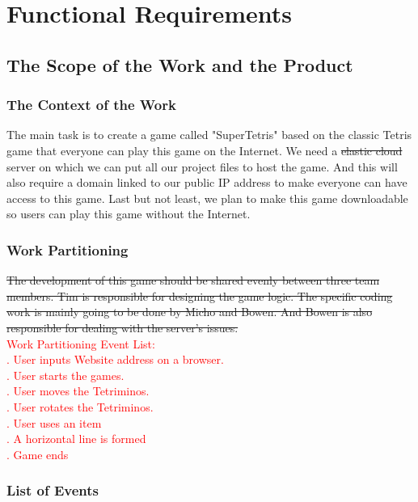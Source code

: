 \documentclass[12pt, titlepage]{article}
\begin{document}
\section{Functional Requirements}

\subsection{The Scope of the Work and the Product}

\subsubsection{The Context of the Work}
\tab The main task is to create a game called "SuperTetris" based on the classic Tetris game that everyone can play this game on the Internet. We need a \st{elastic cloud} server on which we can put all our project files to host the game. And this will also require a domain linked to our public IP address to make everyone can have access to this game. Last but not least, we plan to make this game downloadable so users can play this game without the Internet.
\subsubsection{Work Partitioning}
\tab \st{The development of this game should be shared evenly between three team members. Tim is responsible for designing the game logic. The specific coding work is mainly going to be done by Micho and Bowen. And Bowen is also responsible for dealing with the server's issues.}\\
\textcolor{red} {Work Partitioning Event List:\\
. User inputs Website address on a browser.    \\
. User starts the games.\\
. User moves the Tetriminos.\\
. User rotates the Tetriminos.\\
. User uses an item \\
. A horizontal line is formed\\
. Game ends}
\subsubsection{List of Events}
\end{document}
